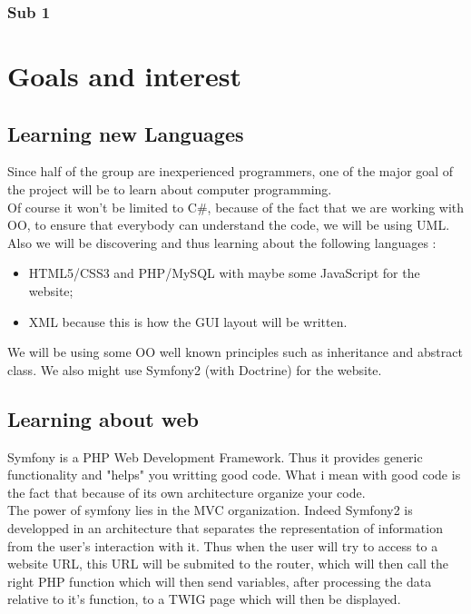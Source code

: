 \documentclass[article]{report} %
\begin{document}
							  \subsection{Sub 1}
				\chapter{Goals and interest}
						\section{Learning new Languages}
								Since half of the group are inexperienced programmers, one of the major goal of the project will be to learn about computer programming.\\
								
								Of course it won't be limited to C\#, because of the fact that we are working with OO, to ensure that everybody can understand the code, we will be using UML.\newline
								Also we will be discovering and thus learning about the following languages : 
								\begin{itemize}
										\item HTML5/CSS3 and PHP/MySQL with maybe some JavaScript for the website;
										\item XML because this is how the GUI layout will be written.
								\end{itemize}
															
								We will be using some OO well known principles such as inheritance and abstract class. We also might use Symfony2 (with Doctrine) for the website.
							  
						\section{Learning about web}
							  		Symfony is a PHP Web Development Framework. Thus it provides generic functionality and "helps" you writting good code. What i mean with good code is the fact that because of its own architecture organize your code.\\
							  		
							  		The power of symfony lies in the MVC organization. Indeed Symfony2 is developped in an architecture that separates the representation of information from the user's interaction with it.\newline
							  		 Thus when the user will try to access to a website URL, this URL will be submited to the router, which will then call the right PHP function which will then send variables, after processing the data relative to it's function, to a TWIG page which will then be displayed.
							  		 
\end{document}
